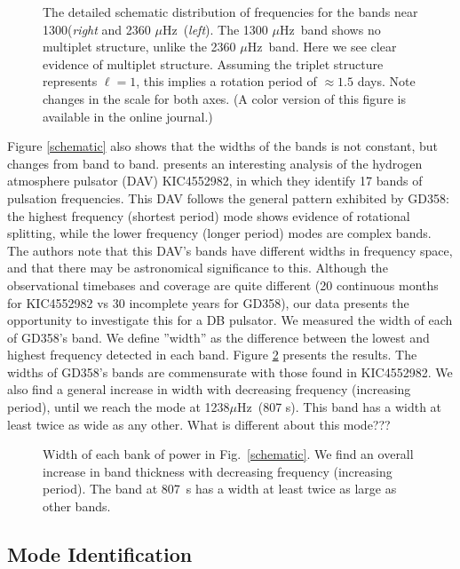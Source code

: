 \documentclass[12pt,preprint]{aastex}
\newcommand{\muHz}{\mbox{$\mu$Hz}}
\begin{document}
\begin{figure}
 \caption{The detailed schematic distribution of frequencies for the bands near 1300({\em{right}}
 and 2360 \muHz\ ({\em{left}}). The 1300 \muHz\ band shows no multiplet structure, unlike the 2360 \muHz\
 band. Here we see clear evidence of multiplet structure. Assuming the triplet structure represents
 $\ell=1$, this implies a rotation period of $\approx 1.5$ days. Note changes in the scale for both axes.
 (A color version of this figure is available in the online journal.)
 \label{rot}}
\end{figure}

Figure \ref{schematic} also shows that the widths of the bands is not constant, but changes from band to band.
\citet{Bell15} presents an interesting analysis of the hydrogen atmosphere pulsator (DAV) KIC4552982, 
in which they identify 17 bands of pulsation frequencies. This DAV follows the general pattern exhibited 
by GD358: the highest frequency (shortest period) mode shows evidence of rotational splitting, while the 
lower frequency (longer period) modes are complex bands. The authors note that this DAV's bands have 
different widths in frequency space, and that there may be astronomical significance to this. Although the 
observational timebases and coverage are quite different (20 continuous months for KIC4552982 vs 30 
incomplete years for GD358), our data presents the opportunity to investigate this for a DB pulsator.  
We measured the width of each of GD358's band. We define ''width'' as the difference between the 
lowest and highest frequency detected in each band. Figure \ref{thick} presents the results. 
The widths of GD358's bands are commensurate with those found in KIC4552982.  We also find a general 
increase in width with decreasing frequency (increasing period), until we reach 
the mode at 1238\muHz\ (807 s). This band has a width at least twice as wide as any other.  What 
is different about this mode???

\begin{figure}
 \caption{Width of each bank of power in Fig.~\ref{schematic}. We find an overall increase 
 in band thickness with decreasing frequency (increasing period).  The band at 807~s has a width
 at least twice as large as other bands.  
 \label{thick}}
\end{figure}


\subsection{Mode Identification}
\end{document}

